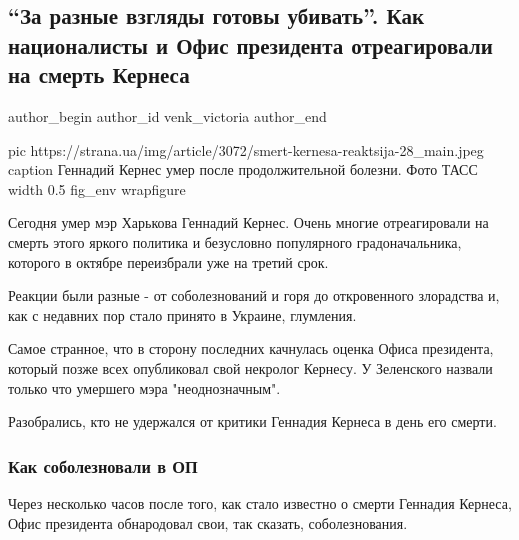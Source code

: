  
 
 
 
 
 
\subsection{\enquote{За разные взгляды готовы убивать}. Как националисты и Офис президента отреагировали на смерть Кернеса}
\label{sec:17_12_2020.news.ua.strana.venk_victoria.1.kernes_reactions_nazis}
\ifcmt
	author_begin
   author_id venk_victoria
	author_end
\fi

\ifcmt
  pic https://strana.ua/img/article/3072/smert-kernesa-reaktsija-28_main.jpeg
  caption Геннадий Кернес умер после продолжительной болезни. Фото ТАСС 
  width 0.5
  fig_env wrapfigure
\fi

Сегодня умер мэр Харькова Геннадий
Кернес.
Очень многие отреагировали на смерть этого яркого политика и безусловно
популярного градоначальника, которого в октябре переизбрали уже на третий срок. 

Реакции были разные - от соболезнований и горя до откровенного злорадства и,
как с недавних пор стало принято в Украине, глумления. 

Самое странное, что в сторону последних качнулась оценка Офиса президента,
который позже всех опубликовал свой некролог Кернесу. У Зеленского назвали
только что умершего мэра "неоднозначным". 

Разобрались, кто не удержался от критики Геннадия Кернеса в день его смерти.

\subsubsection{Как соболезновали в ОП}

Через несколько часов после того, как стало известно о смерти Геннадия Кернеса,
Офис президента обнародовал свои, так сказать, соболезнования.

